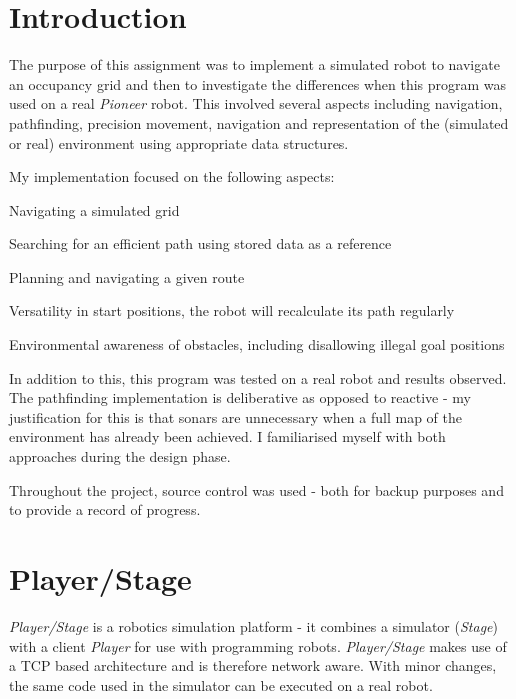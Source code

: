 \documentclass[a4paper,12pt]{article}
\begin{document}

\thispagestyle{empty} %
\tableofcontents %
\clearpage
{} %

\section{Introduction}
The purpose of this assignment was to implement a simulated robot to navigate an occupancy grid and then to investigate the differences when this program was used on a real \textit{Pioneer} robot. This involved several aspects including navigation, pathfinding, precision movement, navigation and representation of the (simulated or real) environment using appropriate data structures. 

My implementation focused on the following aspects:

\begin{arrowlist}
    \item{Navigating a simulated grid}
    \item{Searching for an efficient path using stored data as a reference}
    \item{Planning and navigating a given route}
    \item{Versatility in start positions, the robot will recalculate its path regularly}
    \item{Environmental awareness of obstacles, including disallowing illegal goal positions}
\end{arrowlist}

In addition to this, this program was tested on a real robot and results observed. The pathfinding implementation is deliberative as opposed to reactive - my justification for this is that sonars are unnecessary when a full map of the environment has already been achieved. I familiarised myself with both approaches during the design phase.

Throughout the project, source control was used - both for backup purposes and to provide a record of progress.

\scriptsize
\begin{mdframed}

\end{mdframed}
\normalsize

\section{Player/Stage}
\textit{Player/Stage} is a robotics simulation platform - it combines a simulator (\textit{Stage}) with a client \textit{Player} for use with programming robots. \textit{Player/Stage} makes use of a TCP based architecture \cite{pstcp} and is therefore network aware. With minor changes, the same code used in the simulator can be executed on a real robot.
\end{document}

